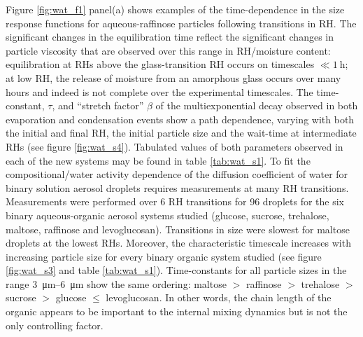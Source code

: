  Figure \ref{fig:wat_f1} panel(a) shows examples of the time-dependence in the size response functions for aqueous-raffinose particles following transitions in RH. The significant changes in the equilibration time reflect the significant changes in particle viscosity that are observed over this range in RH/moisture content: equilibration at RHs above the glass-transition RH occurs on timescales $\ll \SI{1}{\hour}$; at low RH, the release of moisture from an amorphous glass occurs over many hours and indeed is not complete over the experimental timescales. The time-constant, $\tau$, and ``stretch factor” $\beta$ of the multiexponential decay observed in both evaporation and condensation events show a path dependence, varying with both the initial and final RH, the initial particle size and the wait-time at intermediate RHs (see figure \ref{fig:wat_s4}). Tabulated values of both parameters observed in each of the new systems may be found in table \ref{tab:wat_s1}. To fit the compositional/water activity dependence of the diffusion coefficient of water for binary solution aerosol droplets requires measurements at many RH transitions\cite{Ingram2017,Rickards2015}.
Measurements were performed over \num{6} RH transitions for \num{96} droplets for the six binary aqueous-organic aerosol systems studied (glucose, sucrose, trehalose, maltose, raffinose and levoglucosan). Transitions in size were slowest for maltose droplets at the lowest RHs. Moreover, the characteristic timescale increases with increasing particle size for every binary organic system studied (see figure \ref{fig:wat_s3} and table \ref{tab:wat_s1}). Time-constants for all particle sizes in the range \SIrange{3}{6}{\micro\meter} show the same ordering: maltose $>$ raffinose $>$ trehalose $>$ sucrose $>$ glucose $\le$ levoglucosan. In other words, the chain length of the organic appears to be important to the internal mixing dynamics but is not the only controlling factor.

